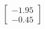 \documentclass[preview]{standalone}
\begin{document}
\begin{align*}
\begin{bmatrix} -1.95 \\ -0.45 \end{bmatrix}
\end{align*}
\end{document}
